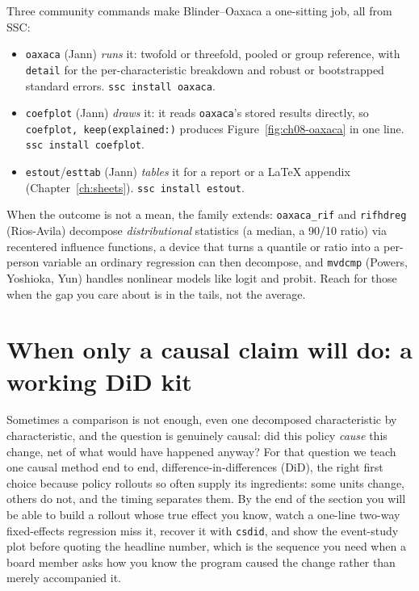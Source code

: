 \begin{kaobox}[frametitle={SSC toolkit: running, interpreting, and drawing a decomposition}]
Three community commands make Blinder--Oaxaca a one-sitting job, all from SSC:
\begin{itemize}
    \item \texttt{oaxaca} (Jann) \emph{runs} it: twofold or threefold, pooled or group reference, with \texttt{detail} for the per-characteristic breakdown and robust or bootstrapped standard errors. \texttt{ssc install oaxaca}.
    \item \texttt{coefplot} (Jann) \emph{draws} it: it reads \texttt{oaxaca}'s stored results directly, so \texttt{coefplot, keep(explained:)} produces Figure~\ref{fig:ch08-oaxaca} in one line. \texttt{ssc install coefplot}.
    \item \texttt{estout}/\texttt{esttab} (Jann) \emph{tables} it for a report or a \LaTeX{} appendix (Chapter~\ref{ch:sheets}). \texttt{ssc install estout}.
\end{itemize}
When the outcome is not a mean, the family extends: \texttt{oaxaca\_rif} and \texttt{rifhdreg} (Rios-Avila) decompose \emph{distributional} statistics (a median, a 90/10 ratio) via recentered influence functions, a device that turns a quantile or ratio into a per-person variable an ordinary regression can then decompose, and \texttt{mvdcmp} (Powers, Yoshioka, Yun) handles nonlinear models like logit and probit. Reach for those when the gap you care about is in the tails, not the average.
\end{kaobox}

\section{When only a causal claim will do: a working DiD kit}\label{sec:did}
Sometimes a comparison is not enough, even one decomposed characteristic by characteristic, and the question is genuinely causal: did this policy \emph{cause} this change, net of what would have happened anyway? For that question we teach one causal method end to end, difference-in-differences (DiD), the right first choice because policy rollouts so often supply its ingredients: some units change, others do not, and the timing separates them. By the end of the section you will be able to build a rollout whose true effect you know, watch a one-line two-way fixed-effects regression miss it, recover it with \texttt{csdid}, and show the event-study plot before quoting the headline number, which is the sequence you need when a board member asks how you know the program caused the change rather than merely accompanied it.

